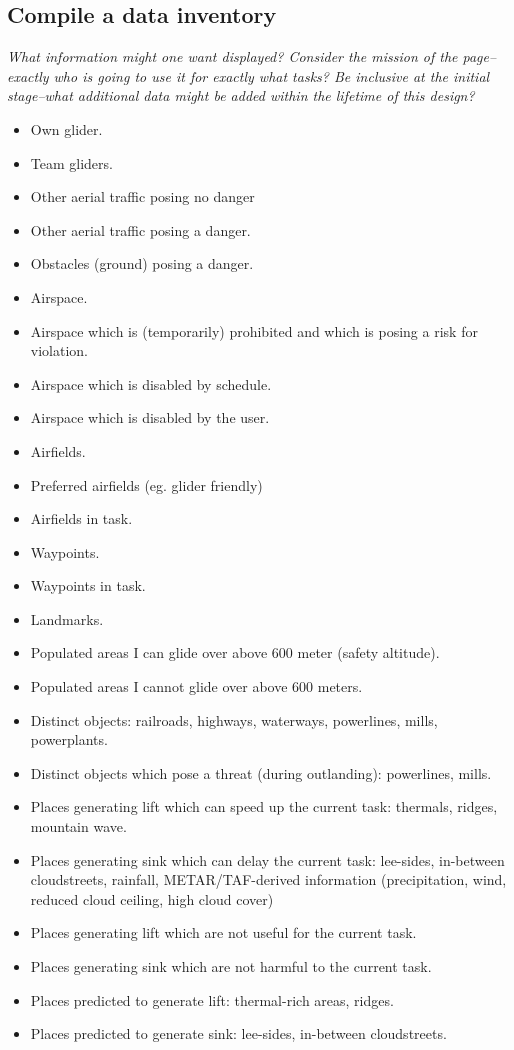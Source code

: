 \documentclass{article}
\newcommand{\myquote}[1]
{
	\textit{#1}
}
\begin{document}
\subsection{Compile a data inventory}
\myquote{What information might one want displayed? Consider the mission of the page--exactly who is going to use it for exactly what tasks? Be inclusive at the initial stage--what additional data might be added within the lifetime of this design?}
\begin{itemize}
\item Own glider.
\item Team gliders.
\item Other aerial traffic posing no danger
\item Other aerial traffic posing a danger.
\item Obstacles (ground) posing a danger.
\item Airspace.
\item Airspace which is (temporarily) prohibited and which is posing a risk for violation.
\item Airspace which is disabled by schedule.
\item Airspace which is disabled by the user.
\item Airfields.
\item Preferred airfields (eg. glider friendly)
\item Airfields in task.
\item Waypoints.
\item Waypoints in task.
\item Landmarks.
\item Populated areas I can glide over above 600 meter (safety altitude).
\item Populated areas I cannot glide over above 600 meters.
\item Distinct objects: railroads, highways, waterways, powerlines, mills, powerplants.
\item Distinct objects which pose a threat (during outlanding): powerlines, mills.
\item Places generating lift which can speed up the current task: thermals,
	ridges, mountain wave.
\item Places generating sink which can delay the current task:
	lee-sides, in-between cloudstreets, rainfall, METAR/TAF-derived information
	(precipitation, wind, reduced cloud ceiling, high cloud cover)
\item Places generating lift which are not useful for the current task.
\item Places generating sink which are not harmful to the current task.
\item Places predicted to generate lift: thermal-rich areas, ridges.
\item Places predicted to generate sink: lee-sides, in-between cloudstreets.
\end{itemize}
\end{document}
